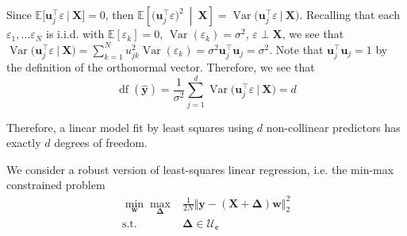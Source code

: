 \documentclass{article}
\numberwithin{equation}{section}
\begin{document}
Since $ \mathbb{E}\big[\mathbf{u}_j^\top\varepsilon \ \big| \
\mathbf{X}\big] = 0 $, then $ \mathbb{E}\left[\big(\mathbf{u}_j^\top
\varepsilon\big)^2 \ \middle\vert \ \mathbf{X}\right] = \operatorname{Var}
\big(\mathbf{u}_j^\top\varepsilon \ \big| \ \mathbf{X}\big) $. Recalling
that each $ \varepsilon_1, \ldots \varepsilon_N $ is i.i.d. with
$ \mathbb{E}[\varepsilon_k] = 0 $, $ \operatorname{Var}(\varepsilon_k) =
\sigma^2 $, $ \varepsilon \perp \mathbf{X} $, we see that
$ \operatorname{Var}\big(\mathbf{u}_j^\top\varepsilon \ \big| \
\mathbf{X}\big) = \sum_{k = 1}^Nu_{jk}^2\operatorname{Var}(\varepsilon_k) =
\sigma^2\mathbf{u}_j^\top\mathbf{u}_j = \sigma^2 $. Note that
$ \mathbf{u}_j^\top\mathbf{u}_j = 1 $ by the definition of the orthonormal
vector. Therefore, we see that
\begin{equation*}
    \operatorname{df}(\hat{\mathbf{y}}) =
    \frac{1}{\sigma^2}\sum_{j = 1}^d\operatorname{Var}\big(
        \mathbf{u}_j^\top\varepsilon \ \big| \ \mathbf{X}
    \big) = d
\end{equation*}

Therefore, a linear model fit by least squares using $ d $ non-collinear
predictors has exactly $ d $ degrees of freedom.


We consider a robust version of least-squares linear regression, i.e. the
min-max constrained problem
\begin{equation} \label{eq:robust_linear_lsq}
    \begin{array}{rl}
        \displaystyle\min_\mathbf{w}\max_{\boldsymbol{\Delta}} &
        \frac{1}{2N}\Vert\mathbf{y} -
        (\mathbf{X} + \boldsymbol{\Delta})\mathbf{w}\Vert_2^2 \\
        \text{s.t.} & \boldsymbol{\Delta} \in \mathcal{U}_\mathbf{c}
    \end{array}
\end{equation}
\end{document}
